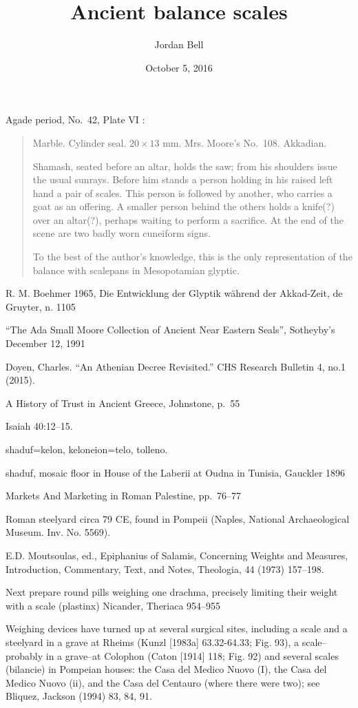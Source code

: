 \documentclass{article}
\title{Ancient balance scales}
\author{Jordan Bell}
\date{October 5, 2016}
\begin{document}
\maketitle

Agade period, No.~42, Plate VI \cite[p.~46]{OIP47}:

\begin{quote}
Marble. Cylinder seal. $20 \times 13$ mm. Mrs. Moore's No.~108. Akkadian.

Shamash, seated before an altar, holds the saw; from his shoulders issue the usual 
sunrays. Before him stands a person holding in his raised left hand a pair of scales. This 
person is followed by another, who carries a goat as an offering. A smaller person behind
the others holds a knife(?) over an altar(?), perhaps waiting to perform a sacrifice. At
the end of the scene are two badly worn cuneiform signs.

To the best of the author's knowledge, this is the only representation of the balance with scalepans in
Mesopotamian glyptic.
\end{quote}

R. M. Boehmer 1965, Die Entwicklung der Glyptik w\"ahrend der
Akkad-Zeit, de Gruyter, n. 1105

``The Ada Small Moore Collection of Ancient Near Eastern Seals'', Sotheyby's December 12, 1991

Doyen, Charles. ``An Athenian Decree Revisited.'' CHS Research Bulletin 4, no.1 (2015).

A History of Trust in Ancient Greece, Johnstone, p.~55

Isaiah 40:12--15.

shaduf=kelon, keloneion=telo, tolleno. 

shaduf, mosaic floor in House of the Laberii at Oudna in Tunisia, Gauckler 1896

Markets And Marketing in Roman Palestine, pp.~76--77

Roman steelyard circa 79 CE, found in Pompeii (Naples, National Archaeological Museum. Inv. No. 5569).

E.D. Moutsoulas, ed., Epiphanius of Salamis, Concerning Weights and Measures, Introduction, Commentary, Text, and Notes, Theologia, 44 (1973) 157--198.

Next prepare round pills weighing one drachma, precisely limiting their weight with a scale (plastinx) Nicander, Theriaca 954--955

Weighing devices have turned up at several surgical sites, including a scale and a steelyard in a grave at Rheims (Kunzl [1983a] 63.32-64.33; Fig. 93), a scale--probably in a grave--at Colophon (Caton [1914] 118; Fig. 92) and several scales (bilancie) in Pompeian houses: the Casa del Medico Nuovo (I), the Casa del Medico Nuovo (ii), and the Casa del Centauro (where there were two); see Bliquez, Jackson (1994) 83, 84, 91.
\end{document}
